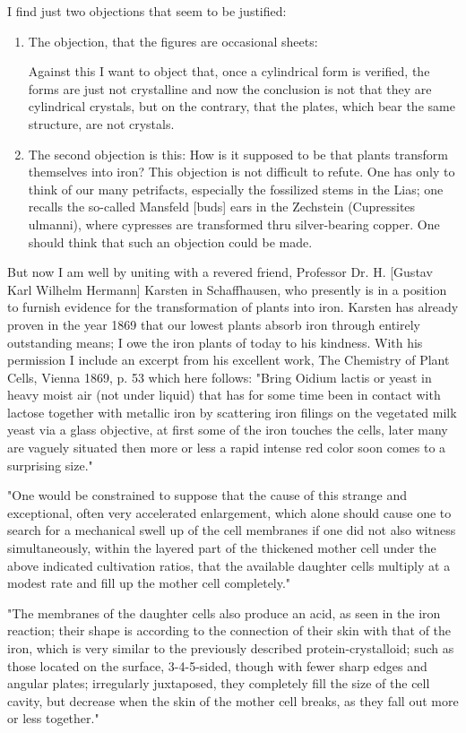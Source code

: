 \documentclass[a4paper, 12pt, oneside]{article}
\begin{document}
I find just two objections that seem to be justified:
\begin{enumerate}
    \item The objection, that the figures are occasional sheets:
    
    Against this I want to object that, once a cylindrical form is verified, the forms are just not crystalline and now the conclusion is not that they are cylindrical crystals, but on the contrary, that the plates, which bear the same structure, are not crystals.
    \item The second objection is this: How is it supposed to be that plants transform themselves into iron? This objection is not difficult to refute. One has only to think of our many petrifacts, especially the fossilized stems in the Lias; one recalls the so-called Mansfeld [buds] ears in the Zechstein (Cupressites ulmanni), where cypresses are transformed thru silver-bearing copper. One should think that such an objection could be made.
\end{enumerate}
But now I am well by uniting with a revered friend, Professor Dr. H. [Gustav Karl Wilhelm Hermann] Karsten in Schaffhausen, who presently is in a position to furnish evidence for the transformation of plants into iron. Karsten has already proven in the year 1869 that our lowest plants absorb iron through entirely outstanding means; I owe the iron plants of today to his kindness. With his permission I include an excerpt from his excellent work, The Chemistry of Plant Cells, Vienna 1869, p. 53 which here follows: "Bring Oidium lactis or yeast in heavy moist air (not under liquid) that has for some time been in contact with lactose together with metallic iron by scattering iron filings on the vegetated milk yeast via a glass objective, at first some of the iron touches the cells, later many are vaguely situated then more or less a rapid intense red color soon comes to a surprising size."

"One would be constrained to suppose that the cause of this strange and exceptional, often very accelerated enlargement, which alone should cause one to search for a mechanical swell up of the cell membranes if one did not also witness simultaneously, within the layered part of the thickened mother cell under the above indicated cultivation ratios, that the available daughter cells multiply at a modest rate and fill up the mother cell completely."

"The membranes of the daughter cells also produce an acid, as seen in the iron reaction; their shape is according to the connection of their skin with that of the iron, which is very similar to the previously described protein-crystalloid; such as those located on the surface, 3-4-5-sided, though with fewer sharp edges and angular plates; irregularly juxtaposed, they completely fill the size of the cell cavity, but decrease when the skin of the mother cell breaks, as they fall out more or less together."
\end{document}
